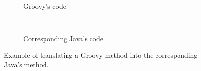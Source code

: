

\begin{figure}[tb]
	\ssp
    \centering
    \begin{subfigure}[t]{2.7in}
        \centering
		
        \caption{Groovy's code}
        \label{groovycode}
    \end{subfigure}\\
    \begin{subfigure}[t]{4.35in}
        \centering
		
        \caption{Corresponding Java's code}
        \label{javacode}
    \end{subfigure}
    \caption{Example of translating a Groovy method into the corresponding Java's method.}
    \label{translationexample}
\end{figure}

